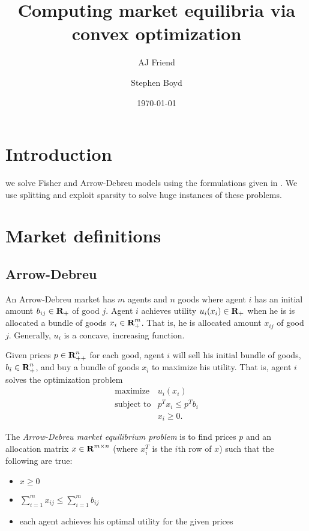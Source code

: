 \documentclass{article}
\title{Computing market equilibria via convex optimization}
\author{AJ Friend \and Stephen Boyd}
\date{\today}
\begin{document}
\maketitle

\listoftodos

\section{Introduction}
we solve Fisher and Arrow-Debreu models using the formulations given in . We use splitting and exploit sparsity to solve huge instances of these problems.

\section{Market definitions}
\subsection{Arrow-Debreu}

An Arrow-Debreu market has $m$ agents and $n$ goods where
agent $i$ has an initial amount $b_{ij} \in {\mbox{\bf R}}_+$ of good $j$.
Agent $i$ achieves utility $u_i(x_i) \in {\mbox{\bf R}}_+$ when he is is allocated a bundle of goods $x_i \in {\mbox{\bf R}}^m_{+}$.
That is, he is allocated amount $x_{ij}$ of good $j$.
Generally, $u_i$ is a concave, increasing function.

Given prices $p \in {\mbox{\bf R}}^n_{++}$ for each good, agent $i$ will sell his initial bundle of goods, $b_i \in {\mbox{\bf R}}^n_+ $, and buy a bundle of goods $x_i$ to maximize his utility.
That is, agent $i$ solves the optimization problem
\[
\begin{array}{ll}
\mbox{maximize} & u_i(x_i) \\
\mbox{subject to} & p^T x_i \leq p^T b_i \\
& x_i \geq 0.
\end{array}
\]

The \emph{Arrow-Debreu market equilibrium problem} is to find prices $p$ and an allocation matrix $x \in {\mbox{\bf R}}^{m \times n}$ (where $x_i^T$ is the $i$th row of $x$) such that the following are true:
\begin{itemize}
\item $x \geq 0$
\item $\sum_{i=1}^m x_{ij} \leq \sum_{i=1}^m b_{ij}$
\item each agent achieves his optimal utility for the given prices
\end{itemize}
\end{document}
